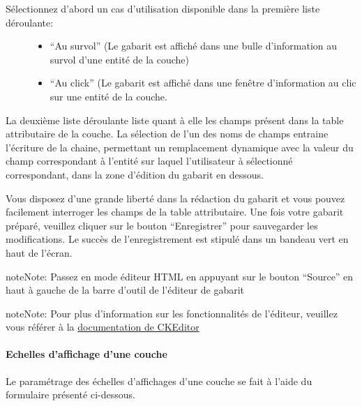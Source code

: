 \documentclass[letterpaper,10pt,french]{sphinxmanual}
\begin{document}
\begin{description}
\item[{Sélectionnez d'abord un cas d'utilisation disponible dans la première liste déroulante:}] \leavevmode\begin{itemize}
\item {} 
``Au survol'' (Le gabarit est affiché dans une bulle d'information au survol d'une entité de la couche)

\item {} 
``Au click'' (Le gabarit est affiché dans une fenêtre d'information au clic sur une entité de la couche.

\end{itemize}

\end{description}

La deuxième liste déroulante liste quant à elle les champs présent
dans la table attributaire de la couche. La sélection de l'un des noms
de champs entraine l'écriture de la chaine, permettant un remplacement
dynamique avec la valeur du champ correspondant à l'entité sur laquel
l'utilisateur à sélectionné correspondant, dans la zone
d'édition du gabarit en dessous.

Vous disposez d'une grande liberté dans la rédaction du gabarit et vous pouvez facilement interroger les champs de la table attributaire. Une fois votre gabarit préparé, veuillez cliquer sur le bouton ``Enregistrer'' pour sauvegarder les modifications. Le succès de l'enregistrement est stipulé dans un bandeau vert en haut de l'écran.

\begin{notice}{note}{Note:}
Passez en mode éditeur HTML en appuyant sur le bouton ``Source'' en haut à gauche de la barre d'outil de l'éditeur de gabarit
\end{notice}

\begin{notice}{note}{Note:}
Pour plus d'information sur les fonctionnalités de l'éditeur, veuillez vous référer à la \href{http://docs.cksource.com/Main\_Page}{documentation de CKEditor}
\end{notice}


\paragraph{Echelles d'affichage d'une couche}
\label{maps/layerstree:echelles-d-affichage-d-une-couche}
Le paramétrage des échelles d'affichages d'une couche se fait à l'aide du
formulaire présenté ci-dessous.
\end{document}

